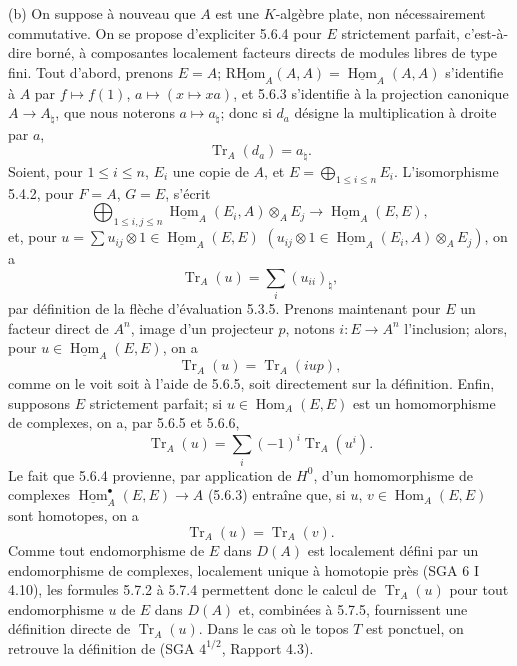 \documentclass[11pt]{article}
\DeclareMathOperator{\Hom}{Hom}
\providecommand{\RHom}{\mathrm{RHom}}
\providecommand{\uRHom}{\underline{\RHom}}
\providecommand{\uHom}{\underline{\Hom}}
\providecommand{\Tr}{\operatorname{Tr}}
\providecommand{\Tr}{\operatorname{Tr}}
\providecommand{\Tr}{\operatorname{Tr}}
\providecommand{\RHom}{\mathrm{RHom}}
\providecommand{\Hom}{\operatorname{Hom}}
\providecommand{\RHom}{\mathrm R\mathcal{H}om}
\providecommand{\Tr}{\operatorname{Tr}}
\providecommand{\RHom}{\mathrm{RHom}}
\providecommand{\Hom}{\operatorname{Hom}}
\providecommand{\Tr}{\operatorname{Tr}}
\begin{document}
(b) On suppose à nouveau que $A$ est une $K$-algèbre plate, non nécessairement commutative. On se propose d'expliciter 5.6.4 pour $E$ strictement parfait, c'est-à-dire borné, à composantes localement facteurs directs de modules libres de type fini. Tout d'abord, prenons $E=A$; $\uRHom_A(A,A)=\uHom_A(A,A)$ s'identifie à $A$ par $f\mapsto f(1)$, $a\mapsto(x\mapsto xa)$, et 5.6.3 s'identifie à la projection canonique $A\to A_\natural$, que nous noterons $a\mapsto a_\natural$; donc si $d_a$ désigne la multiplication à droite par $a$,
\begin{equation}\tag{5.7.1}
\Tr_A(d_a)=a_\natural.
\end{equation}
Soient, pour $1\le i\le n$, $E_i$ une copie de $A$, et $E=\bigoplus_{1\le i\le n}E_i$. L'isomorphisme 5.4.2, pour $F=A$, $G=E$, s'écrit
\[
\bigoplus_{1\le i,j\le n}\uHom_A(E_i,A)\otimes_AE_j\longrightarrow\uHom_A(E,E),
\]
et, pour $u=\sum u_{ij}\otimes 1\in\uHom_A(E,E)$ $(u_{ij}\otimes 1\in\uHom_A(E_i,A)\otimes_A E_j)$, on a
\begin{equation}\tag{5.7.2}
\Tr_A(u)=\sum_i (u_{ii})_\natural,
\end{equation}
par définition de la flèche d'évaluation 5.3.5. Prenons maintenant pour $E$ un facteur direct de $A^n$, image d'un projecteur $p$, notons $i:E\to A^n$ l'inclusion; alors, pour $u\in\uHom_A(E,E)$, on a
\begin{equation}\tag{5.7.3}
\Tr_A(u)=\Tr_A(iup),
\end{equation}
comme on le voit soit à l'aide de 5.6.5, soit directement sur la définition. Enfin, supposons $E$ strictement parfait; si $u\in\Hom_A(E,E)$ est un homomorphisme de complexes, on a, par 5.6.5 et 5.6.6,
\begin{equation}\tag{5.7.4}
\Tr_A(u)=\sum_i(-1)^i\Tr_A(u^i).
\end{equation}
Le fait que 5.6.4 provienne, par application de $H^0$, d'un homomorphisme de complexes $\uHom_A^\bullet(E,E)\to A$ (5.6.3) entraîne que, si $u$, $v\in\Hom_A(E,E)$ sont homotopes, on a
\begin{equation}\tag{5.7.5}
\Tr_A(u)=\Tr_A(v).
\end{equation}
Comme tout endomorphisme de $E$ dans $D(A)$ est localement défini par un endomorphisme de complexes, localement unique à homotopie près (SGA 6 I 4.10), les formules 5.7.2 à 5.7.4 permettent donc le calcul de $\Tr_A(u)$ pour tout endomorphisme $u$ de $E$ dans $D(A)$ et, combinées à 5.7.5, fournissent une définition directe de $\Tr_A(u)$. Dans le cas où le topos $T$ est ponctuel, on retrouve la définition de (SGA $4^{1/2}$, Rapport 4.3).
\end{document}
